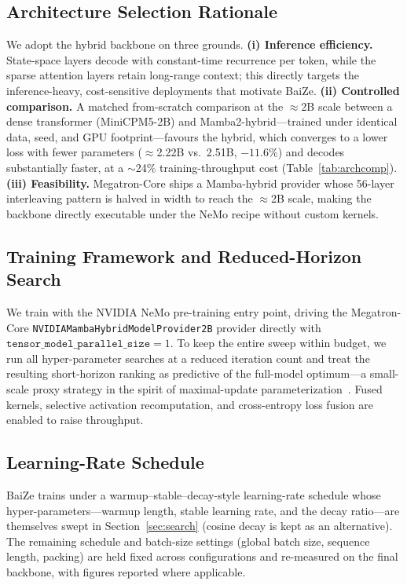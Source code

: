 \subsection{Architecture Selection Rationale}\label{sec:arch-rationale}
We adopt the hybrid backbone on three grounds.
\textbf{(i) Inference efficiency.} State-space layers decode with constant-time recurrence per token, while the sparse attention layers retain long-range context; this directly targets the inference-heavy, cost-sensitive deployments that motivate BaiZe.
\textbf{(ii) Controlled comparison.} A matched from-scratch comparison at the $\approx$2B scale between a dense transformer (MiniCPM5-2B) and Mamba2-hybrid---trained under identical data, seed, and GPU footprint---favours the hybrid, which converges to a lower loss with fewer parameters ($\approx$2.22B vs.\ 2.51B, $-11.6\%$) and decodes substantially faster, at a $\sim$24\% training-throughput cost (Table~\ref{tab:archcomp}).
\textbf{(iii) Feasibility.} Megatron-Core ships a Mamba-hybrid provider whose 56-layer interleaving pattern is halved in width to reach the $\approx$2B scale, making the backbone directly executable under the NeMo recipe without custom kernels.

\subsection{Training Framework and Reduced-Horizon Search}\label{sec:framework}
We train with the NVIDIA NeMo pre-training entry point, driving the Megatron-Core \texttt{NVIDIAMambaHybridModelProvider2B} provider directly with $\texttt{tensor\_model\_parallel\_size}=1$.
To keep the entire sweep within budget, we run all hyper-parameter searches at a reduced iteration count and treat the resulting short-horizon ranking as predictive of the full-model optimum---a small-scale proxy strategy in the spirit of maximal-update parameterization~\cite{yang2022tensor}.
Fused kernels, selective activation recomputation, and cross-entropy loss fusion are enabled to raise throughput.

\subsection{Learning-Rate Schedule}\label{sec:wsd}
BaiZe trains under a warmup--stable--decay-style learning-rate schedule whose hyper-parameters---warmup length, stable learning rate, and the decay ratio---are themselves swept in Section~\ref{sec:search} (cosine decay is kept as an alternative).
The remaining schedule and batch-size settings (global batch size, sequence length, packing) are held fixed across configurations and re-measured on the final backbone, with figures reported where applicable.

